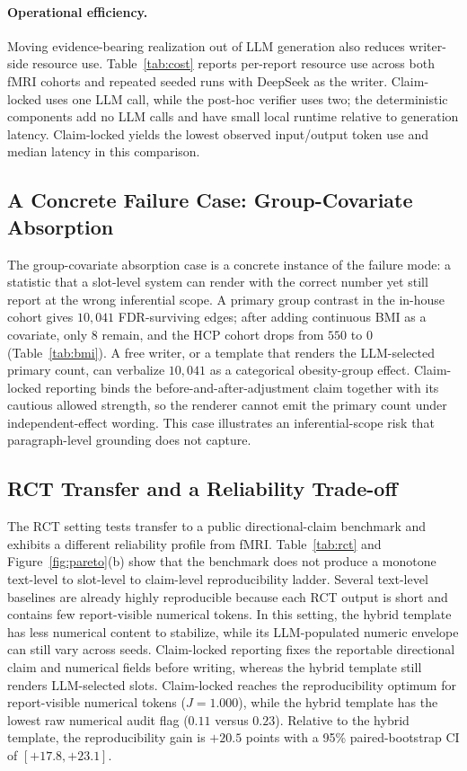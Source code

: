 \documentclass[10pt,twocolumn]{article}
\begin{document}
\paragraph{Operational efficiency.} Moving evidence-bearing realization out of LLM generation also reduces writer-side resource use. Table~\ref{tab:cost} reports per-report resource use across both fMRI cohorts and repeated seeded runs with DeepSeek as the writer. Claim-locked uses one LLM call, while the post-hoc verifier uses two; the deterministic components add no LLM calls and have small local runtime relative to generation latency. Claim-locked yields the lowest observed input/output token use and median latency in this comparison.

\subsection{A Concrete Failure Case: Group-Covariate Absorption}
\label{sec:bmi}


The group-covariate absorption case is a concrete instance of the failure mode: a statistic that a slot-level system can render with the correct number yet still report at the wrong inferential scope. A primary group contrast in the in-house cohort gives $10{,}041$ FDR-surviving edges; after adding continuous BMI as a covariate, only $8$ remain, and the HCP cohort drops from $550$ to $0$ (Table~\ref{tab:bmi}). A free writer, or a template that renders the LLM-selected primary count, can verbalize $10{,}041$ as a categorical obesity-group effect. Claim-locked reporting binds the before-and-after-adjustment claim together with its cautious allowed strength, so the renderer cannot emit the primary count under independent-effect wording. This case illustrates an inferential-scope risk that paragraph-level grounding does not capture.

\subsection{RCT Transfer and a Reliability Trade-off}
\label{sec:rct}

The RCT setting tests transfer to a public directional-claim benchmark and exhibits a different reliability profile from fMRI. Table~\ref{tab:rct} and Figure~\ref{fig:pareto}(b) show that the benchmark does not produce a monotone text-level to slot-level to claim-level reproducibility ladder. Several text-level baselines are already highly reproducible because each RCT output is short and contains few report-visible numerical tokens. In this setting, the hybrid template has less numerical content to stabilize, while its LLM-populated numeric envelope can still vary across seeds. Claim-locked reporting fixes the reportable directional claim and numerical fields before writing, whereas the hybrid template still renders LLM-selected slots. Claim-locked reaches the reproducibility optimum for report-visible numerical tokens ($J=1.000$), while the hybrid template has the lowest raw numerical audit flag ($0.11$ versus $0.23$). Relative to the hybrid template, the reproducibility gain is $+20.5$ points with a 95\% paired-bootstrap CI of $[+17.8,+23.1]$.
\end{document}
